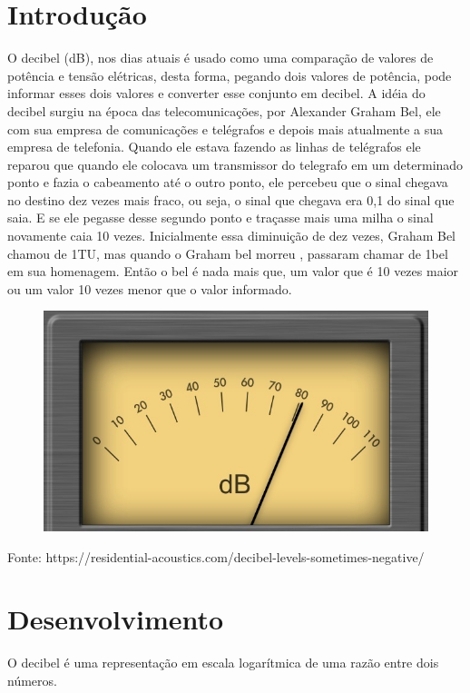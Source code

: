 \section{Introdução}
    O decibel (dB), nos dias atuais é usado como uma comparação de valores de potência e tensão elétricas, desta forma, pegando dois valores de potência, pode informar esses dois valores e converter esse conjunto em decibel.
    A idéia do decibel surgiu na época das telecomunicações, por Alexander Graham Bel, ele com sua empresa de comunicações e telégrafos e depois mais atualmente a sua empresa de telefonia.
    Quando ele estava fazendo as linhas de telégrafos ele reparou que quando ele colocava um transmissor do telegrafo em um determinado ponto e fazia o cabeamento até o outro ponto, ele percebeu que o sinal chegava no destino dez vezes mais fraco, ou seja, o sinal que chegava era 0,1 do sinal que saia. E se ele pegasse desse segundo ponto e traçasse mais uma milha o sinal novamente caia 10 vezes. Inicialmente essa diminuição de dez vezes, Graham Bel chamou de 1TU, mas quando o Graham bel morreu , passaram chamar de 1bel em sua homenagem.
    Então o bel é nada mais que, um valor que é 10 vezes maior ou um valor 10 vezes menor que o valor informado.  
    \newline
    
    \begin{figure}[h]
    \centering
    \includegraphics[width = 14cm]{imagem2.jpg}
    \label{fig:my_label}
    \end{figure}
     
    Fonte: https://residential-acoustics.com/decibel-levels-sometimes-negative/
    \newpage
    
    \section{Desenvolvimento}
	O decibel é uma representação em escala logarítmica de uma razão entre dois números.
    
